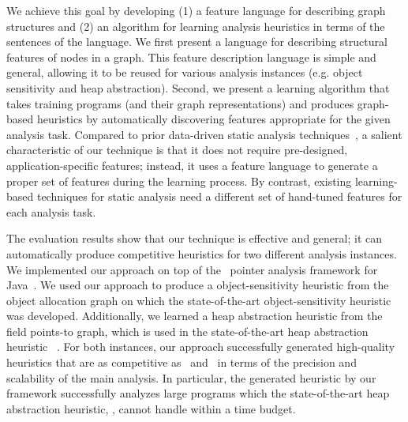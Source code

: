 We achieve this goal by developing (1) a feature language for describing graph structures and (2) an algorithm for learning analysis heuristics in terms of the sentences of the language.
We first present a language for describing structural features of nodes in a graph.
This feature description language is simple and general, allowing it to be reused for various analysis instances (e.g. object sensitivity and heap abstraction).
Second, we present a learning
algorithm that takes training programs (and their graph representations) and produces graph-based heuristics by
automatically discovering features appropriate for the given analysis task.
Compared to prior data-driven static analysis techniques~\cite{JeJeChOh17,JeJeOh18,Singh2018cav,He20pldi},
a salient characteristic of our technique is that it does not require pre-designed, application-specific features; instead, it uses a feature language to generate a proper set of features during the learning process. By contrast, existing learning-based techniques for static analysis need a different set of hand-tuned features for each analysis task.



The evaluation results show that our technique is effective and general;
it can automatically produce competitive heuristics for two different analysis instances.
We implemented our approach on top of the \Doop~pointer
analysis framework for Java~\cite{BravenboerS09}.
We used our approach to produce
a object-sensitivity heuristic from the object allocation graph on
which the state-of-the-art object-sensitivity heuristic
\Scaler~\cite{Li2018b} was developed.
Additionally, we learned a heap
abstraction heuristic from the field points-to graph, which is
 used in the state-of-the-art heap abstraction heuristic
\Mahjong~\cite{Tan2017}.  For both instances, our approach
successfully generated high-quality heuristics that are as competitive as
\Scaler~and \Mahjong~in terms of the precision and scalability of the main analysis.
In particular, the generated heuristic by our framework successfully
analyzes large programs which the state-of-the-art heap abstraction
heuristic, \Mahjong, cannot handle within a time budget.




